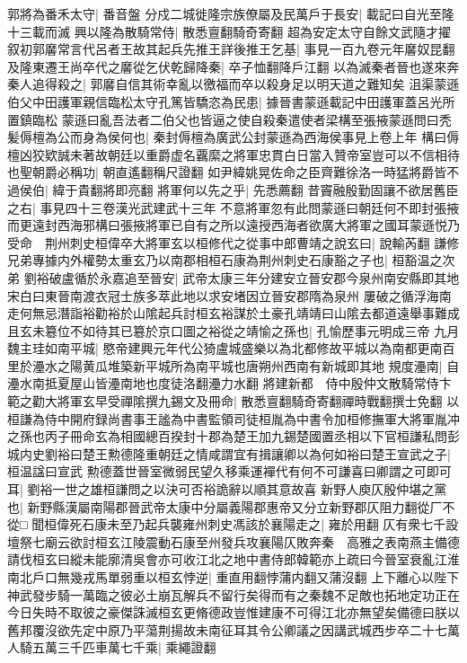 郭將為番禾太守|{
	番音盤}
分戍二城徙隆宗族僚屬及民萬戶于長安|{
	載記曰自光至隆十三載而滅}
興以隆為散騎常侍|{
	散悉亶翻騎奇寄翻}
超為安定太守自餘文武隨才擢叙初郭黁常言代呂者王故其起兵先推王詳後推王乞基|{
	事見一百九卷元年黁奴昆翻}
及隆東遷王尚卒代之黁從乞伏乾歸降秦|{
	卒子恤翻降戶江翻}
以為滅秦者晉也遂來奔秦人追得殺之|{
	郭黁自信其術幸亂以徼福而卒以殺身足以明天道之難知矣}
沮渠蒙遜伯父中田護軍親信臨松太守孔篤皆驕恣為民患|{
	據晉書蒙遜載記中田護軍蓋呂光所置鎮臨松}
蒙遜曰亂吾法者二伯父也皆逼之使自殺秦遣使者梁構至張掖蒙遜問曰秃髪傉檀為公而身為侯何也|{
	秦封傉檀為廣武公封蒙遜為西海侯事見上卷上年}
構曰傉檀凶狡欵誠未著故朝廷以重爵虚名覊縻之將軍忠貫白日當入贊帝室豈可以不信相待也聖朝爵必稱功|{
	朝直遙翻稱尺證翻}
如尹緯姚晃佐命之臣齊難徐洛一時猛將爵皆不過侯伯|{
	緯于貴翻將即亮翻}
將軍何以先之乎|{
	先悉薦翻}
昔竇融殷勤固讓不欲居舊臣之右|{
	事見四十三卷漢光武建武十三年}
不意將軍忽有此問蒙遜曰朝廷何不即封張掖而更遠封西海邪構曰張掖將軍已自有之所以遠授西海者欲廣大將軍之國耳蒙遜悦乃受命　荆州刺史桓偉卒大將軍玄以桓修代之從事中郎曹靖之說玄曰|{
	說輸芮翻}
謙修兄弟專據内外權勢太重玄乃以南郡相桓石康為荆州刺史石康豁之子也|{
	桓豁温之次弟}
劉裕破盧循於永嘉追至晉安|{
	武帝太康三年分建安立晉安郡今泉州南安縣即其地宋白曰東晉南渡衣冠士族多萃此地以求安堵因立晉安郡隋為泉州}
屢破之循浮海南走何無忌潛詣裕勸裕於山隂起兵討桓玄裕謀於土豪孔靖靖曰山隂去都道遠舉事難成且玄未簒位不如待其已簒於京口圖之裕從之靖愉之孫也|{
	孔愉歷事元明成三帝}
九月魏主珪如南平城|{
	愍帝建興元年代公猗盧城盛樂以為北都修故平城以為南都更南百里於灅水之陽黄瓜堆築新平城所為南平城也唐朔州西南有新城即其地}
規度灅南|{
	自灅水南抵夏屋山皆灅南地也度徒洛翻灅力水翻}
將建新都　侍中殷仲文散騎常侍卞範之勸大將軍玄早受禪隂撰九錫文及冊命|{
	散悉亶翻騎奇寄翻禪時戰翻撰士免翻}
以桓謙為侍中開府録尚書事王謐為中書監領司徒桓胤為中書令加桓修撫軍大將軍胤冲之孫也丙子冊命玄為相國總百揆封十郡為楚王加九錫楚國置丞相以下官桓謙私問彭城内史劉裕曰楚王勲德隆重朝廷之情咸謂宜有揖讓卿以為何如裕曰楚王宣武之子|{
	桓温諡曰宣武}
勲德蓋世晉室微弱民望久移乘運襌代有何不可謙喜曰卿謂之可即可耳|{
	劉裕一世之雄桓謙問之以決可否裕詭辭以順其意故喜}
新野人庾仄殷仲堪之黨也|{
	新野縣漢屬南陽郡晉武帝太康中分屬義陽郡惠帝又分立新野郡仄阻力翻從厂不從□}
聞桓偉死石康未至乃起兵襲雍州刺史馮該於襄陽走之|{
	雍於用翻}
仄有衆七千設壇祭七廟云欲討桓玄江陵震動石康至州發兵攻襄陽仄敗奔秦　高雅之表南燕主備德請伐桓玄曰縱未能廓清吳會亦可收江北之地中書侍郎韓範亦上疏曰今晉室衰亂江淮南北戶口無幾戎馬單弱重以桓玄悖逆|{
	重直用翻悖蒲内翻又蒲沒翻}
上下離心以陛下神武發步騎一萬臨之彼必土崩瓦解兵不留行矣得而有之秦魏不足敵也拓地定功正在今日失時不取彼之豪傑誅滅桓玄更脩德政豈惟建康不可得江北亦無望矣備德曰朕以舊邦覆沒欲先定中原乃平蕩荆揚故未南征耳其令公卿議之因講武城西步卒二十七萬人騎五萬三千匹車萬七千乘|{
	乘繩證翻}

